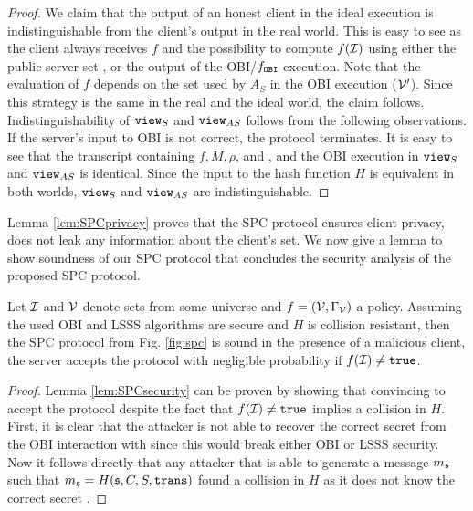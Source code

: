 \begin{proof}
We claim that the output of an honest client in the ideal execution is indistinguishable from the client's output in the real world.
This is easy to see as the client always receives $f$ and the possibility to compute $f(\mathcal{I})$ using either the public server set \ServerSet, or the output of the \ac{OBI}/$f_\mathtt{OBI}$ execution.
Note that the evaluation of $f$ depends on the set used by $A_S$ in the \ac{OBI} execution ($\mathcal{V}'$).
Since this strategy is the same in the real and the ideal world, the claim follows.
Indistinguishability of $\mathtt{view}_S$ and $\mathtt{view}_{AS}$ follows from the following observations.
If the server's input to \ac{OBI} is not correct, the protocol terminates.
It is easy to see that the transcript containing $f, M, \rho$, and \ServerSet, and the \ac{OBI} execution in $\mathtt{view}_S$ and $\mathtt{view}_{AS}$ is identical.
Since the input to the hash function $H$ is equivalent in both worlds, $\mathtt{view}_S$ and $\mathtt{view}_{AS}$ are indistinguishable.

\end{proof}

\noindent
Lemma \ref{lem:SPCprivacy} proves that the \ac{SPC} protocol ensures client privacy, \ie does not leak any information about the client's set.
We now give a lemma to show soundness of our \ac{SPC} protocol that concludes the security analysis of the proposed \ac{SPC} protocol.

\begin{lemma}[Soundness]\label{lem:SPCsecurity}
  Let $\mathcal{I}$ and $\mathcal{V}$ denote sets from some universe and $f=(\mathcal{V},\Gamma_\mathcal{V})$ a policy.
  Assuming the used \ac{OBI} and \ac{LSSS} algorithms are secure and $H$ is collision resistant, then the \ac{SPC} protocol from Fig. \ref{fig:spc} is sound in the presence of a malicious client, \ie the server accepts the protocol with negligible probability if $f(\mathcal{I})\not=\mathtt{true}$.
\end{lemma}

\begin{proof}
Lemma \ref{lem:SPCsecurity} can be proven by showing that convincing \Server to accept the protocol despite the fact that $f(\mathcal{I})\not=\mathtt{true}$ implies a collision in $H$.
First, it is clear that the attacker is not able to recover the correct secret \secret from the \ac{OBI} interaction with \Server since this would break either \ac{OBI} or \ac{LSSS} security.
Now it follows directly that any attacker that is able to generate a message $m_\mathfrak{s}$ such that $m_\mathfrak{s}=H(\mathfrak{s},C,S,\mathtt{trans})$ found a collision in $H$ as it does not know the correct secret \secret.
\end{proof}


